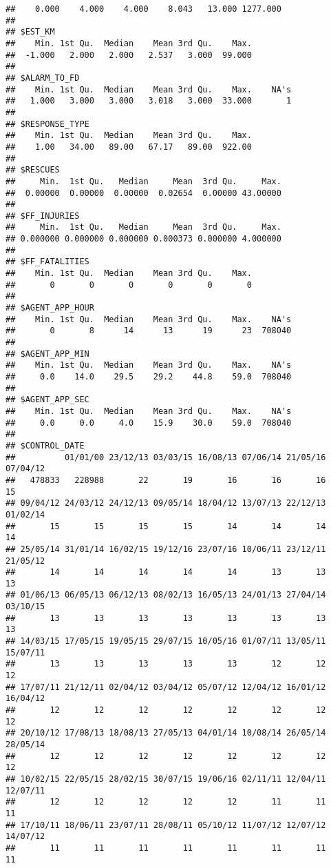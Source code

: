 \documentclass[]{article}
\begin{document}
\begin{verbatim}
##    0.000    4.000    4.000    8.043   13.000 1277.000 
## 
## $EST_KM
##    Min. 1st Qu.  Median    Mean 3rd Qu.    Max. 
##  -1.000   2.000   2.000   2.537   3.000  99.000 
## 
## $ALARM_TO_FD
##    Min. 1st Qu.  Median    Mean 3rd Qu.    Max.    NA's 
##   1.000   3.000   3.000   3.018   3.000  33.000       1 
## 
## $RESPONSE_TYPE
##    Min. 1st Qu.  Median    Mean 3rd Qu.    Max. 
##    1.00   34.00   89.00   67.17   89.00  922.00 
## 
## $RESCUES
##     Min.  1st Qu.   Median     Mean  3rd Qu.     Max. 
##  0.00000  0.00000  0.00000  0.02654  0.00000 43.00000 
## 
## $FF_INJURIES
##     Min.  1st Qu.   Median     Mean  3rd Qu.     Max. 
## 0.000000 0.000000 0.000000 0.000373 0.000000 4.000000 
## 
## $FF_FATALITIES
##    Min. 1st Qu.  Median    Mean 3rd Qu.    Max. 
##       0       0       0       0       0       0 
## 
## $AGENT_APP_HOUR
##    Min. 1st Qu.  Median    Mean 3rd Qu.    Max.    NA's 
##       0       8      14      13      19      23  708040 
## 
## $AGENT_APP_MIN
##    Min. 1st Qu.  Median    Mean 3rd Qu.    Max.    NA's 
##     0.0    14.0    29.5    29.2    44.8    59.0  708040 
## 
## $AGENT_APP_SEC
##    Min. 1st Qu.  Median    Mean 3rd Qu.    Max.    NA's 
##     0.0     0.0     4.0    15.9    30.0    59.0  708040 
## 
## $CONTROL_DATE
##          01/01/00 23/12/13 03/03/15 16/08/13 07/06/14 21/05/16 07/04/12 
##   478833   228988       22       19       16       16       16       15 
## 09/04/12 24/03/12 24/12/13 09/05/14 18/04/12 13/07/13 22/12/13 01/02/14 
##       15       15       15       15       14       14       14       14 
## 25/05/14 31/01/14 16/02/15 19/12/16 23/07/16 10/06/11 23/12/11 21/05/12 
##       14       14       14       14       14       13       13       13 
## 01/06/13 06/05/13 06/12/13 08/02/13 16/05/13 24/01/13 27/04/14 03/10/15 
##       13       13       13       13       13       13       13       13 
## 14/03/15 17/05/15 19/05/15 29/07/15 10/05/16 01/07/11 13/05/11 15/07/11 
##       13       13       13       13       13       12       12       12 
## 17/07/11 21/12/11 02/04/12 03/04/12 05/07/12 12/04/12 16/01/12 16/04/12 
##       12       12       12       12       12       12       12       12 
## 20/10/12 17/08/13 18/08/13 27/05/13 04/01/14 10/08/14 26/05/14 28/05/14 
##       12       12       12       12       12       12       12       12 
## 10/02/15 22/05/15 28/02/15 30/07/15 19/06/16 02/11/11 12/04/11 12/07/11 
##       12       12       12       12       12       11       11       11 
## 17/10/11 18/06/11 23/07/11 28/08/11 05/10/12 11/07/12 12/07/12 14/07/12 
##       11       11       11       11       11       11       11       11 

\end{verbatim}
\end{document}
